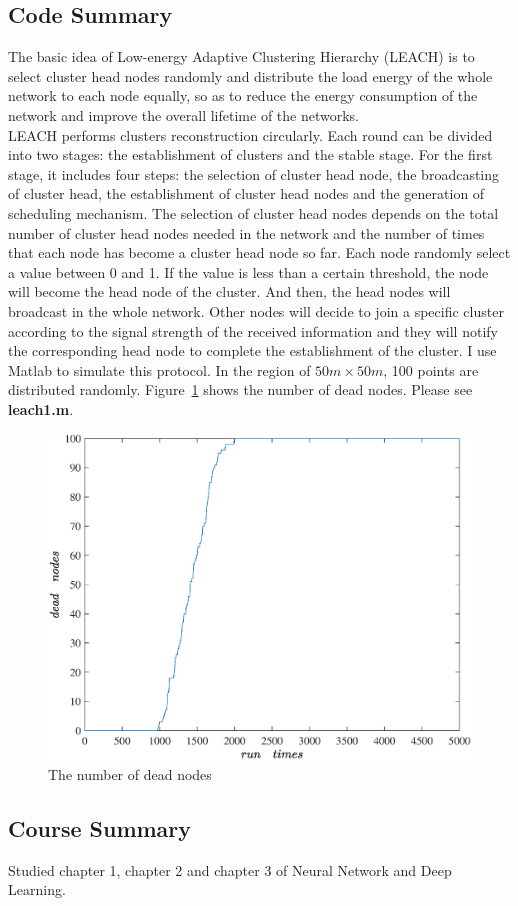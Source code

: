 \documentclass[11pt]{report}
\begin{document}
	\subsection{Code Summary}
	The basic idea of Low-energy Adaptive Clustering Hierarchy (LEACH) \cite{926982} is to select cluster head nodes randomly and distribute the load energy of the whole network to each node equally, so as to reduce the energy consumption of the network and improve the overall lifetime of the networks.\\
	
	\noindent LEACH performs clusters reconstruction circularly. Each round can be divided into two stages: the establishment of clusters and the stable stage. For the first stage, it includes four steps: the selection of cluster head node, the broadcasting of cluster head, the establishment of cluster head nodes and the generation of scheduling mechanism. The selection of cluster head nodes depends on the total number of cluster head nodes needed in the network and the number of times that each node has become a cluster head node so far. Each node randomly select a value between 0 and 1. If the value is less than a certain threshold, the node will become the head node of the cluster. And then, the head nodes will broadcast in the whole network. Other nodes will decide to join a specific cluster according to the signal strength of the received information and they will notify the corresponding head node to complete the establishment of the cluster. I use Matlab to simulate this protocol. In the region of $50m\times50m$, 100 points are distributed randomly. Figure~\ref{2ndfig} shows the number of dead nodes. Please see \textbf{leach1.m}.\\
	
	\begin{figure}[h!]
		\centering
		\includegraphics[width=0.4\linewidth]{leach.eps}
		\caption{The number of dead nodes}
		\label{2ndfig}
	\end{figure}
	\subsection{Course Summary}
	Studied chapter 1, chapter 2 and chapter 3 of Neural Network and Deep Learning.
\end{document}
